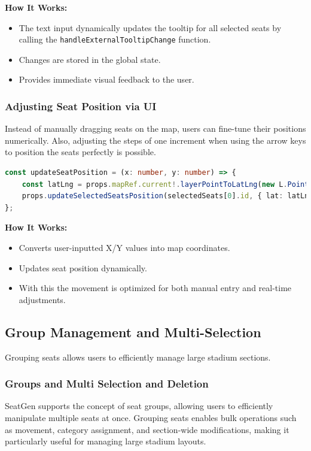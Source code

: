 \textbf{How It Works:}
\begin{itemize}
    \item The text input dynamically updates the tooltip for all selected seats by calling the \texttt{handleExternalTooltipChange} function.
    \item Changes are stored in the global state.
    \item Provides immediate visual feedback to the user.
\end{itemize}

\subsubsection{Adjusting Seat Position via UI}
Instead of manually dragging seats on the map, users can fine-tune their positions numerically. Also, adjusting the steps of one increment when using the arrow keys to position the seats perfectly is possible.

\begin{lstlisting}[language=TypeScript, caption=Updating Seat Coordinates, label=lst:update-seat-position]
const updateSeatPosition = (x: number, y: number) => {
    const latLng = props.mapRef.current!.layerPointToLatLng(new L.Point(x, y));
    props.updateSelectedSeatsPosition(selectedSeats[0].id, { lat: latLng.lat, lng: latLng.lng }, true);
};
\end{lstlisting}

\textbf{How It Works:}
\begin{itemize}
    \item Converts user-inputted X/Y values into map coordinates.
    \item Updates seat position dynamically.
    \item With this the movement is optimized for both manual entry and real-time adjustments.
\end{itemize}

\subsection{Group Management and Multi-Selection}
Grouping seats allows users to efficiently manage large stadium sections.
\subsubsection{Groups and Multi Selection and Deletion}

SeatGen supports the concept of seat groups, allowing users to efficiently manipulate multiple seats at once. Grouping seats enables bulk operations such as movement, category assignment, and section-wide modifications, making it particularly useful for managing large stadium layouts.

